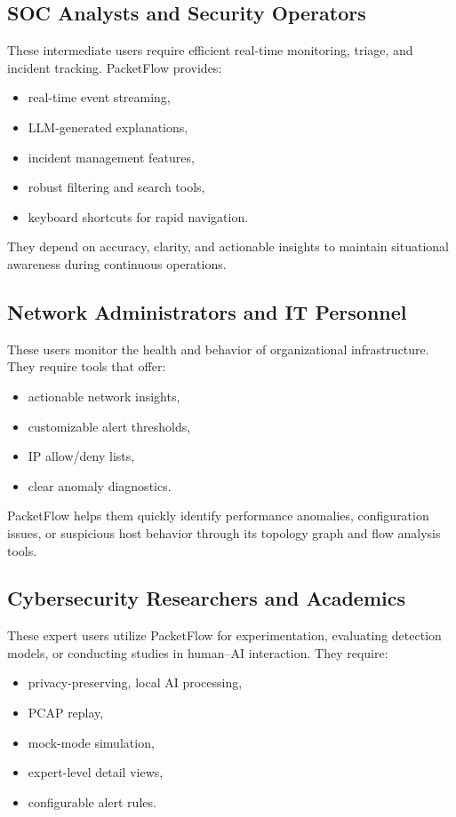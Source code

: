 \documentclass[
    11pt, 
    a4paper, 
    parskip=half, 
    headsepline,       %
    DIV=12             %
]{scrartcl}
\begin{document}
\subsection{SOC Analysts and Security Operators}
These intermediate users require efficient real-time monitoring, triage, and incident tracking. PacketFlow provides:
\begin{itemize}
    \item real-time event streaming,
    \item LLM-generated explanations,
    \item incident management features,
    \item robust filtering and search tools,
    \item keyboard shortcuts for rapid navigation.
\end{itemize}

They depend on accuracy, clarity, and actionable insights to maintain situational awareness during continuous operations.

\subsection{Network Administrators and IT Personnel}
These users monitor the health and behavior of organizational infrastructure. They require tools that offer:
\begin{itemize}
    \item actionable network insights,
    \item customizable alert thresholds,
    \item IP allow/deny lists,
    \item clear anomaly diagnostics.
\end{itemize}

PacketFlow helps them quickly identify performance anomalies, configuration issues, or suspicious host behavior through its topology graph and flow analysis tools.

\subsection{Cybersecurity Researchers and Academics}
These expert users utilize PacketFlow for experimentation, evaluating detection models, or conducting studies in human--AI interaction. They require:
\begin{itemize}
    \item privacy-preserving, local AI processing,
    \item PCAP replay,
    \item mock-mode simulation,
    \item expert-level detail views,
    \item configurable alert rules.
\end{itemize}
\end{document}
